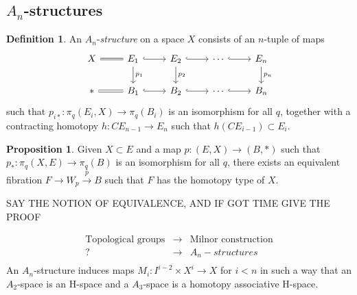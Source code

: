 \documentclass{beamer}
\theoremstyle{definition}
\newtheorem{defi}{Definition}
\newtheorem{prop}[teorema]{Proposition}
\begin{document}
\subsection{$A_n$-structures}
\begin{frame}[fragile]
\begin{defi}
An $A_n$-\emph{structure} on a space $X$ consists of an $n$-tuple of maps
\[
\begin{tikzcd}
X \arrow[r, equals] & E_1\arrow[r, hook]\arrow[d, "p_1"] & E_2\arrow[r, hook]\arrow[d, "p_2"] &\cdots\arrow[r, hook]& E_n\arrow[d, "p_n"] \\
*\arrow[r, equals] & B_1\arrow[r, hook] & 
B_2\arrow[r, hook]&\cdots\arrow[r, hook]& B_n
\end{tikzcd}
\]
such that $p_{i*}:\pi_q(E_i,X)\to \pi_q(B_i)$ is an isomorphism for all $q$, together with a contracting homotopy $h:CE_{n-1}\to E_n$ such that $h(CE_{i-1})\subset E_i$. %

\end{defi}
\end{frame}

\begin{frame}
\begin{prop}
Given $X\subset E$ and a map $p:(E,X)\to (B,*)$ such that $p_*:\pi_q(X,E)\to \pi_q(B)$ is an isomorphism for all $q$, there exists an equivalent fibration $F\to W_p\xrightarrow{\bar{p}} B$ such that $F$ has the homotopy type of $X$. 
\end{prop}
SAY THE NOTION OF EQUIVALENCE, AND IF GOT TIME GIVE THE PROOF
\end{frame}

\begin{frame}
\[
\begin{array}{ccc}
\text{Topological groups} & \rightarrow & \text{Milnor construction}\\
? & \rightarrow  & A_n-structures\\
& &
\end{array}
\]
\pause
An $A_n$-structure induces maps $M_i:I^{i-2}\times X^i\to X$ for $i<n$ in such a way that an $A_2$-space is an H-space and a $A_3$-space is a homotopy associative H-space. %
\end{frame}
\end{document}
